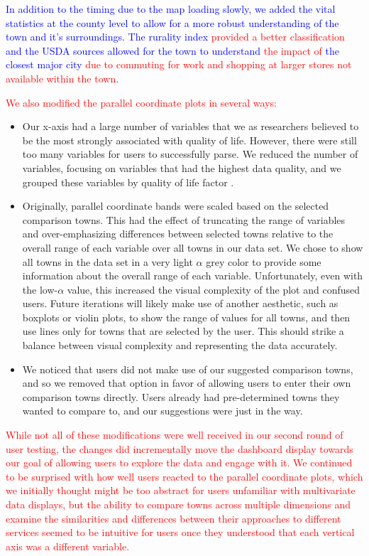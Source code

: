 \documentclass[letterpaper,inpress]{jdsart}
\providecommand{\tightlist}{%
  \setlength{\itemsep}{0pt}\setlength{\parskip}{0pt}}
\begin{document}
{\textcolor{blue}{In addition to the timing due to the map loading slowly, we added the vital statistics at the county level to allow for a more robust understanding of the town and it's surroundings. The rurality index {\textcolor{red}{provided a better classification}} and the USDA sources allowed for the town to understand {\textcolor{red}{the impact of}} the closest major city {\textcolor{red}{due to commuting for work and shopping at larger stores not available within the town}}.}}

{\textcolor{red}{We also modified the parallel coordinate plots in several ways:}}

\begin{itemize}
\tightlist
\item
  Our x-axis had a large number of variables that we as researchers believed to be the most strongly associated with quality of life. However, there were still too many variables for users to successfully parse. We reduced the number of variables, focusing on variables that had the highest data quality, and we grouped these variables by quality of life factor \citep{petersCommunityResiliencyDeclining2019}.
\item
  Originally, parallel coordinate bands were scaled based on the selected comparison towns. This had the effect of truncating the range of variables and over-emphasizing differences between selected towns relative to the overall range of each variable over all towns in our data set. We chose to show all towns in the data set in a very light \(\alpha\) grey color to provide some information about the overall range of each variable. Unfortunately, even with the low-\(\alpha\) value, this increased the visual complexity of the plot and confused users. Future iterations will likely make use of another aesthetic, such as boxplots or violin plots, to show the range of values for all towns, and then use lines only for towns that are selected by the user. This should strike a balance between visual complexity and representing the data accurately.
\item
  We noticed that users did not make use of our suggested comparison towns, and so we removed that option in favor of allowing users to enter their own comparison towns directly. Users already had pre-determined towns they wanted to compare to, and our suggestions were just in the way.
\end{itemize}

{\textcolor{red}{While not all of these modifications were well received in our second round of user testing, the changes did incrementally move the dashboard display towards our goal of allowing users to explore the data and engage with it. We continued to be surprised with how well users reacted to the parallel coordinate plots, which we initially thought might be too abstract for users unfamiliar with multivariate data displays, but the ability to compare towns across multiple dimensions and examine the similarities and differences between their approaches to different services seemed to be intuitive for users once they understood that each vertical axis was a different variable.}}
\end{document}
